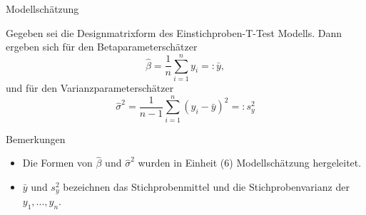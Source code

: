 \documentclass[
  8pt,
  ignorenonframetext,
]{beamer}
\providecommand{\tightlist}{%
  \setlength{\itemsep}{0pt}\setlength{\parskip}{0pt}}
\begin{document}
\begin{frame}{Modellschätzung}
\protect\hypertarget{modellschuxe4tzung}{}
\footnotesize
\begin{theorem}
\normalfont
\justifying
Gegeben sei die Designmatrixform des Einstichproben-T-Test Modells. Dann ergeben
sich für den Betaparameterschätzer
\begin{equation}
\hat{\beta} = \frac{1}{n}\sum_{i=1}^n y_i =: \bar{y},
\end{equation}
und für den Varianzparameterschätzer
\begin{equation}
\hat{\sigma}^2 = \frac{1}{n-1}\sum_{i=1}^n (y_i - \bar{y})^2 =: s_y^2
\end{equation}
\end{theorem}

Bemerkungen

\begin{itemize}
\tightlist
\item
  Die Formen von \(\hat{\beta}\) und \(\hat{\sigma}^2\) wurden in
  Einheit (6) Modellschätzung hergeleitet.
\item
  \(\bar{y}\) und \(s_y^2\) bezeichnen das Stichprobenmittel und die
  Stichprobenvarianz der \(y_1,...,y_n\).
\end{itemize}
\end{frame}
\end{document}
